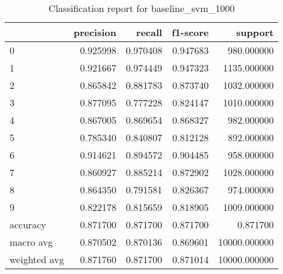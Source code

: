 \begin{table}[htb!]
\centering
\caption{Classification report for baseline_svm_1000}
\label{tab:classification-report-baseline_svm_1000}
\begin{tabular}{lrrrr}
\toprule
 & precision & recall & f1-score & support \\
\midrule
0 & 0.925998 & 0.970408 & 0.947683 & 980.000000 \\
1 & 0.921667 & 0.974449 & 0.947323 & 1135.000000 \\
2 & 0.865842 & 0.881783 & 0.873740 & 1032.000000 \\
3 & 0.877095 & 0.777228 & 0.824147 & 1010.000000 \\
4 & 0.867005 & 0.869654 & 0.868327 & 982.000000 \\
5 & 0.785340 & 0.840807 & 0.812128 & 892.000000 \\
6 & 0.914621 & 0.894572 & 0.904485 & 958.000000 \\
7 & 0.860927 & 0.885214 & 0.872902 & 1028.000000 \\
8 & 0.864350 & 0.791581 & 0.826367 & 974.000000 \\
9 & 0.822178 & 0.815659 & 0.818905 & 1009.000000 \\
accuracy & 0.871700 & 0.871700 & 0.871700 & 0.871700 \\
macro avg & 0.870502 & 0.870136 & 0.869601 & 10000.000000 \\
weighted avg & 0.871760 & 0.871700 & 0.871014 & 10000.000000 \\
\bottomrule
\end{tabular}
\end{table}
